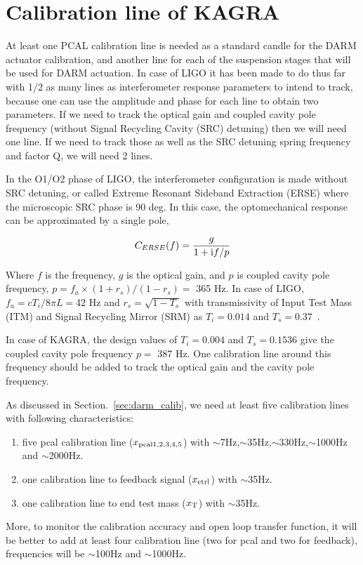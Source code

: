 
\section{Calibration line of KAGRA}
At least one PCAL calibration line is needed as a standard candle 
for the DARM actuator calibration, and 
another line for each of the suspension stages that will be used for DARM 
actuation. In case of LIGO it has been made to do thus far with 1/2 
as many lines as interferometer response parameters to intend to track, 
because one can use the amplitude and phase for each line to obtain two 
parameters. If we need to track the optical gain and coupled cavity pole 
frequency (without Signal Recycling Cavity (SRC) detuning) then we will 
need one line. If we need to track those as well as the SRC detuning spring 
frequency and factor Q, we will need 2 lines.

In the O1/O2 phase of LIGO, the interferometer configuration is made without 
SRC detuning, or called Extreme Resonant Sideband Extraction (ERSE) 
where the microscopic SRC phase is 90 deg.
In this case, the optomechanical response can be approximated by a single pole,

\begin{equation}
C_{ERSE}(f) = \frac{g}{1+{\rm i}f/p}
\end{equation}

Where $f$ is the frequency, $g$ is the optical gain, and $p$ is coupled 
cavity pole frequency, $p=f_a\times(1+r_s)/(1-r_s) =$ 365 Hz.
In case of LIGO, $f_a=cT_i/8\pi L = $42 Hz and $r_s=\sqrt{1-T_s}$ 
with transmissivity of Input Test Mass (ITM) and Signal Recycling Mirror (SRM) 
as $T_i=0.014$ and $T_s=0.37$~\cite{OptSpringCal}.

In case of KAGRA, the design values of $T_i=0.004$ and $T_s=0.1536$ give 
the coupled cavity pole frequency $p=$ 387 Hz. One calibration line around 
this frequency should be added to track the optical gain and the cavity pole 
frequency.

As discussed in Section.~\ref{sec:darm_calib}, we need at least five calibration lines with following characteristics:
\begin{enumerate}
\item five pcal calibration line ($x_{\rm pcal1,2,3,4,5}$) with $\sim$7Hz,$\sim$35Hz,$\sim$330Hz,$\sim$1000Hz  and $\sim$2000Hz. 
\item one calibration line to feedback signal ($x_{\rm ctrl}$) with $\sim$35Hz.
\item one calibration line to end test mass ($x_{\rm T}$) with $\sim$35Hz.
\end{enumerate}
More, to monitor the calibration accuracy and open loop transfer function,
it will be better to add at least four calibration line (two for pcal and two for feedback), 
frequencies will be $\sim$100Hz and $\sim$1000Hz.


